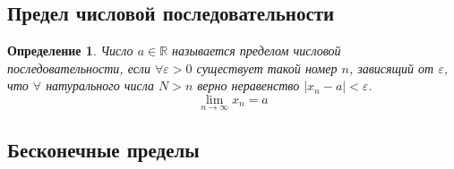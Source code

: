 \documentclass[a4paper,12pt]{article} %
\newtheorem{definition}{Определение}[subsection]
\theoremstyle{remark}
\begin{document}
\subsection{Предел числовой последовательности}
\begin{definition}
	Число $a\in\mathbb{R}$ называется пределом числовой последовательности, если $\forall \varepsilon>0$ существует такой номер $n$, зависящий от $\varepsilon$, что $\forall$ натурального числа $N>n$ верно неравенство $|x_n - a| < \varepsilon$.
	$$\lim_{n\to\infty} x_n = a$$
\end{definition}



\subsection{Бесконечные пределы}
\end{document}
